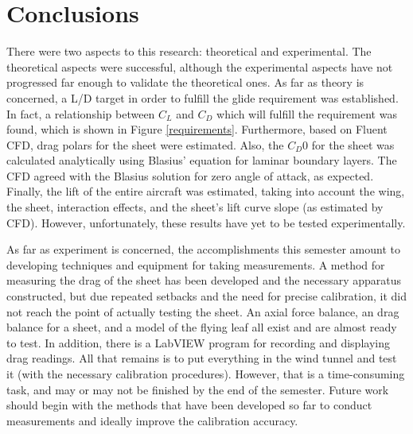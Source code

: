\documentclass[12pt]{report} %
\begin{document}
\chapter{Conclusions}

There were two aspects to this research: theoretical and experimental. The theoretical aspects were successful, although the experimental
aspects have not progressed far enough to validate the theoretical ones. As far as theory is concerned, a L/D target in order to fulfill
the glide requirement was established. In fact, a relationship between $C_L$ and $C_D$ which will fulfill the requirement was found, which
is shown in Figure \ref{requirements}. Furthermore, based on Fluent CFD, drag polars for the sheet were estimated. Also, the $C_D0$ for the
sheet was calculated analytically using Blasius' equation for laminar boundary layers. The CFD agreed with the Blasius solution for zero
angle of attack, as expected. Finally, the lift of the entire aircraft was estimated, taking into account the wing, the sheet, interaction effects,
and the sheet's lift curve slope (as estimated by CFD). However, unfortunately, these results have yet to be tested experimentally.

As far as experiment is concerned, the accomplishments this semester amount to developing techniques and equipment for taking measurements.
A method for measuring the drag of the sheet has been developed and the necessary apparatus constructed, but due repeated setbacks and
the need for precise calibration, it did not reach the point of actually testing the sheet. An axial force balance, an drag balance
for a sheet, and a model of the flying leaf all exist and are almost ready to test. In addition, there is a LabVIEW program for
recording and displaying drag readings. All that remains is to put everything in the wind tunnel and test it (with the necessary
calibration procedures). However, that is a time-consuming task, and may or may not be finished by the end of the semester.
Future work should begin with the methods that have been developed so far to conduct measurements and ideally improve the calibration
accuracy.
\end{document}
